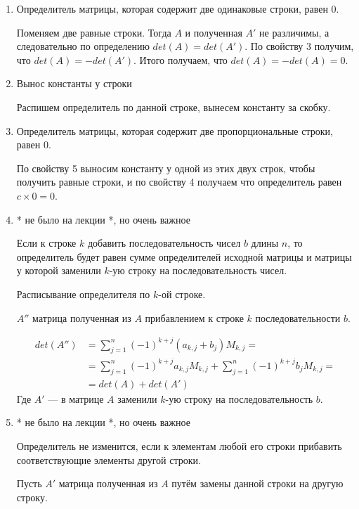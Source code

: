 \begin{enumerate}
	\item Определитель матрицы, которая содержит две одинаковые строки, равен $0$.
	
	Поменяем две равные строки. Тогда $A$ и полученная $A'$ не различимы, а следовательно по определению $det(A) = det(A')$. По свойству 3 получим, что $det(A) = -det(A')$. Итого получаем, что $det(A) = -det(A)= 0$.
		
	\item Вынос константы у строки
	
	Распишем определитель по данной строке, вынесем константу за скобку. 
		
	\item Определитель матрицы, которая содержит две пропорциональные строки, равен $0$. 
	
	По свойству 5 выносим константу у одной из этих двух строк, чтобы получить равные строки, и по свойству 4 получаем что определитель равен $c \times 0 = 0$.
	
	\item * не было на лекции *, но очень важное
	
	Если к строке $k$ добавить последовательность  чисел $b$ длины $n$, то определитель будет равен сумме определителей исходной матрицы и матрицы у которой заменили $k$-ую строку на последовательность чисел.
	
	Расписывание определителя по $k$-ой строке.	
	
	$A''$ матрица полученная из $A$ прибавлением к строке $k$ последовательности $b$.
	
	\begin{equation}
		\begin{split}
		\displaystyle det(A'') &= \sum _{j=1}^{n}(-1)^{k+j} (a_{k, j} + b_{j}) {M}_{k, j} = \\ 
		&= \sum _{j=1}^{n}(-1)^{k+j} a_{k, j} {M}_{k, j} + \sum _{j=1}^{n}(-1)^{k+j} b_{j} {M}_{k, j} = \\
		&= det(A) + det(A')
		\end{split}	
	\end{equation}
	Где $A'$ --- в матрице $A$ заменили $k$-ую строку на последовательность $b$.

	\item * не было на лекции *, но очень важное
	
	Определитель не изменится, если к элементам любой его строки прибавить соответствующие элементы другой строки.
	
	Пусть $A'$ матрица полученная из $A$ путём замены данной строки на другую строку.
	

\end{enumerate}
